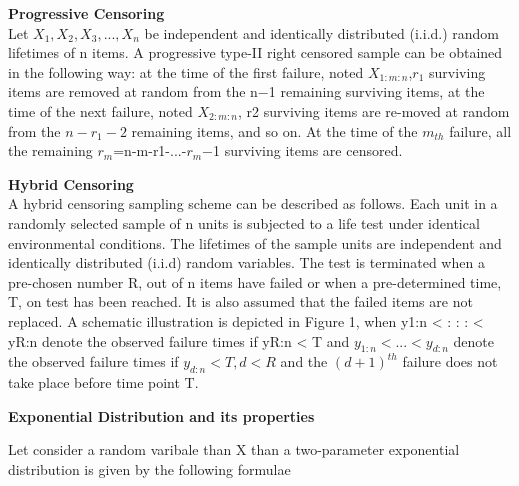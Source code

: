 \documentclass[12pt]{article}
\begin{document}
 \textbf{Progressive Censoring}\\
 Let $X_{1},X_{2},X_{3},...,X_{n}$ be independent and identically distributed (i.i.d.) random lifetimes of n items. A progressive type-II right censored sample can be obtained in the following way: at the time of the first failure, noted $X_{1:m:n}$,$r_{1}$ surviving items are removed at random from the n−1 remaining surviving items, at the time of the next failure, noted $X_{2:m:n}$, r2 surviving items are re-moved at random from the $n-r_{1} - 2$ remaining items, and so on. At the time of the $m_{th}$ failure, all the remaining $r_{m}$=n-m-r1-...-$r_{m}$−1 surviving items are censored.
 
 \textbf{Hybrid Censoring}\\
 A hybrid censoring sampling scheme can be described as follows. Each unit in a randomly selected sample of n units is subjected to a life test under identical environmental conditions. The lifetimes of the sample units are independent and identically distributed (i.i.d) random variables. The test is terminated when a pre-chosen number R, out of n items have failed or when a pre-determined time, T, on test has been reached. It is also assumed that the failed items are not replaced. A schematic illustration is depicted in Figure 1, when y1:n < : : : <
 yR:n denote the observed failure times if yR:n < T and $y_{1:n}<...<y_{d:n}$ denote the observed failure times if $y_{d:n} < T, d < R$ and the $(d + 1)^{th}$ failure does not take place before time point T.


\newpage
\begin{flushleft}
\textbf{\Large Exponential Distribution and its properties}\\
\end{flushleft}
 Let consider a random varibale than X than a two-parameter exponential distribution is given by the following formulae\\
\begin{Parallel}[v]{0.48\textwidth}{0.48\textwidth}
	\ParallelLText{ 
		\[
		f(x)= 
		\begin{cases}
		\frac{1}{\sigma} e^{\frac{-(x-\mu)}{\sigma}}      & \text{iff } -\infty<\mu<\infty,\\
		      \hspace{1.5 cm}x>\mu\\
		0,         & \text{otherwise} 
		\end{cases}
		\] }
\end{Parallel}
     
\end{document}
